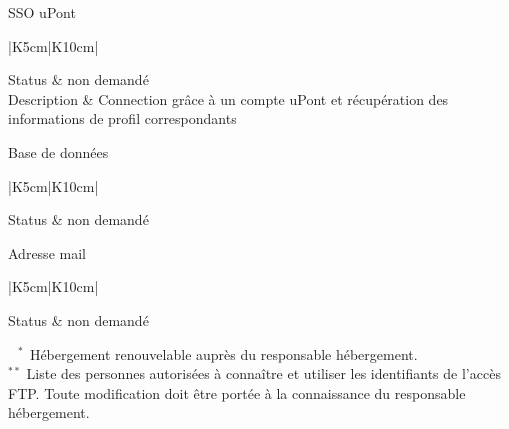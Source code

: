 \documentclass{../ki019}
\newenvironment{tableau}[1]{
\LARGE #1\\
\vspace{0.4cm}
\begin{tabular}{|K{5cm}|K{10cm}|}
}
{
\end{tabular}
\vspace{0.5cm}
}
\begin{document}
\begin{center}
\begin{tableau}{SSO uPont}
\hline
Status & non demandé \\
\hline
Description & Connection grâce à un compte uPont et récupération des informations de profil correspondants \\
\hline
\end{tableau}

\begin{tableau}{Base de données}
\hline
Status & non demandé \\
\hline
\end{tableau}

\begin{tableau}{Adresse mail}
\hline
Status & non demandé \\
\hline
\end{tableau}

\end{center}

\Large \noindent
$^{\phantom{*}*}$ Hébergement renouvelable auprès du responsable hébergement. \\
$^{**}$ Liste des personnes autorisées à connaître et utiliser les identifiants de l'accès FTP. Toute modification doit être portée à la connaissance du responsable hébergement.

\Footer
\end{document}
